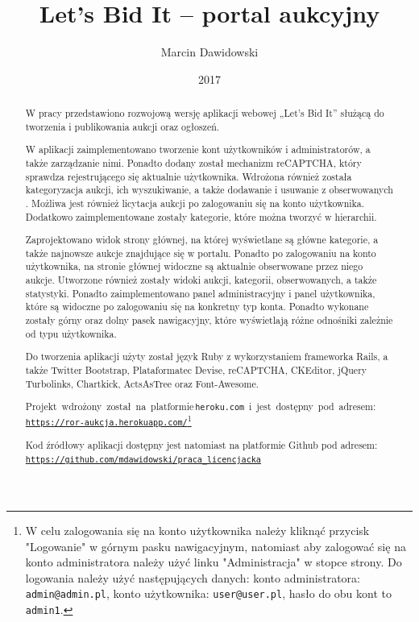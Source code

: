 \documentclass[brudnopis]{xmgr}
\author   {Marcin Dawidowski}
\title    {Let’s Bid It – portal aukcyjny}
\date     {2017}
\begin{document}
\begin{abstract}
  W pracy przedstawiono rozwojową wersję aplikacji webowej „Let's Bid It” służącą do tworzenia i publikowania aukcji oraz ogłoszeń.
  
  W aplikacji zaimplementowano tworzenie kont użytkowników i administratorów, a także zarządzanie nimi. Ponadto dodany został mechanizm reCAPTCHA, który sprawdza rejestrującego się aktualnie użytkownika.  Wdrożona również została kategoryzacja aukcji, ich wyszukiwanie, a także dodawanie i usuwanie z obserwowanych . Możliwa jest również licytacja aukcji po zalogowaniu się na konto użytkownika. Dodatkowo zaimplementowane zostały kategorie, które można tworzyć w hierarchii. 

  Zaprojektowano widok strony głównej, na której wyświetlane są główne kategorie, a także najnowsze aukcje znajdujące się w portalu. Ponadto po zalogowaniu na konto użytkownika, na stronie głównej widoczne są aktualnie obserwowane przez niego aukcje. Utworzone również zostały widoki aukcji, kategorii, obserwowanych, a także statystyki. Ponadto zaimplementowano panel administracyjny i panel użytkownika, które są widoczne po zalogowaniu się na konkretny typ konta. Ponadto wykonane zostały górny oraz dolny pasek nawigacyjny, które wyświetlają różne odnośniki zależnie od typu użytkownika.

  Do tworzenia aplikacji użyty został język Ruby z wykorzystaniem frameworka Rails, a także Twitter Bootstrap, Plataformatec Devise, reCAPTCHA, CKEditor, jQuery Turbolinks, Chartkick, ActsAsTree oraz Font-Awesome.

\mbox{Projekt wdrożony został na platformie\, \\\texttt{heroku.com} i jest dostępny pod adresem:} \\\texttt{\url{https://ror-aukcja.herokuapp.com/}}\footnote{W celu zalogowania się na konto użytkownika należy kliknąć przycisk "Logowanie" w górnym pasku nawigacyjnym, natomiast aby zalogować się na konto administratora należy użyć linku "Administracja" w stopce strony. Do logowania należy użyć następujących danych: konto administratora: \texttt{admin@admin.pl}, konto użytkownika: \texttt{user@user.pl}, hasło do obu kont to \texttt{admin1}.}

Kod źródłowy aplikacji dostępny jest natomiast na platformie Github pod adresem: \\\texttt{\url{https://github.com/mdawidowski/praca_licencjacka}}


\end{abstract}
\end{document}
